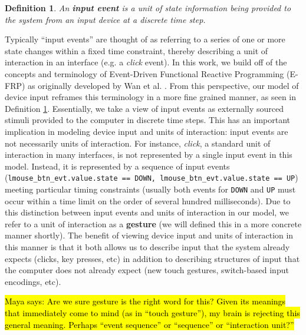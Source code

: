 \documentclass{article}
\newtheorem{define}{Definition}
\begin{document}
\begin{define}
\label{def:event}
An \textbf{input event} is a unit of state information being provided to the system from an input device at a discrete time step.
\end{define}

Typically ``input events'' are thought of as referring to a series of one or more state changes within a fixed time constraint, thereby describing a unit of interaction in an interface (e.g. a \textit{click} event).
In this work, we build off of the concepts and terminology of Event-Driven Functional Reactive Programming (E-FRP) as originally developed by Wan et al. \cite{wan2002event}. From this perspective, our model of device input reframes this terminology in a more fine grained manner, as seen in Definition \ref{def:event}. Essentially, we take a view of input events as externally sourced stimuli provided to the computer in discrete time steps. This has an important implication in modeling device input and units of interaction: input events are not necessarily units of interaction. For instance, \textit{click}, a standard unit of interaction in many interfaces, is not represented by a single input event in this model. Instead, it is represented by a sequence of input events (\texttt{lmouse\_btn\_evt.value.state == DOWN, lmouse\_btn\_evt.value.state == UP}) meeting particular timing constraints (usually both events for \texttt{DOWN} and \texttt{UP} must occur within a time limit on the order of several hundred milliseconds). Due to this distinction between input events and units of interaction in our model, we refer to a unit of interaction as a \textbf{gesture} (we will defined this in a more concrete manner shortly). The benefit of viewing device input and units of interaction in this manner is that it both allows us to describe input that the system already expects (clicks, key presses, etc) in addition to describing structures of input that the computer does not already expect (new touch gestures, switch-based input encodings, etc).

\hl{\tiny Maya says: Are we sure gesture is the right word for this? Given its meanings that immediately come to mind (as in ``touch gesture''), my brain is rejecting this general meaning. Perhaps ``event sequence'' or ``sequence'' or ``interaction unit?''}
\end{document}
